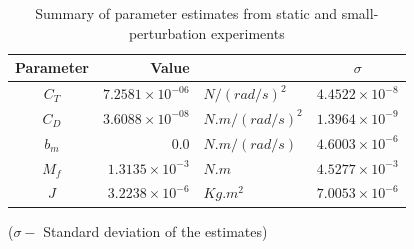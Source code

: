 \begin{table}[h]
    \centering
    \caption{\centering Summary of parameter estimates from static and small-perturbation experiments}
    \label{tab::parm_ests}
    \begin{tabular}{c r l c}
        \hline \hline
        Parameter & Value & & $\sigma$           \\ \hline \hline
        $C_T$ & $7.2581 \times 10^{-06}$ & $N/(rad/s)^2$   & $4.4522 \times 10^{-8}$ \\
        $C_D$ & $3.6088 \times 10^{-08}$ & $N.m/(rad/s)^2$ & $1.3964 \times 10^{-9}$ \\
        $b_m$ & $0.0$                    & $N.m/(rad/s)$   & $4.6003 \times 10^{-6}$  \\
        $M_f$ & $1.3135 \times 10^{-3}$  & $N.m$           & $4.5277 \times 10^{-3}$ \\
        $J$   & $3.2238 \times 10^{-6}$   & $Kg.m^2$        & $7.0053 \times 10^{-6}$ \\
        \hline \hline
    \end{tabular}
    \begin{flushleft}
        ($\sigma - $ Standard deviation of the estimates)
    \end{flushleft}
\end{table}
